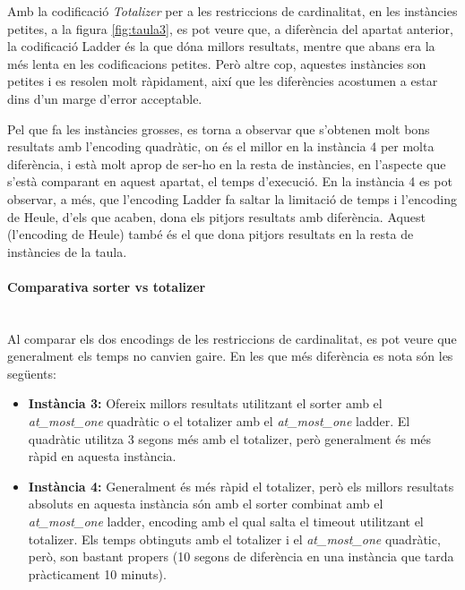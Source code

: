 \documentclass[11pt,a4paper,twoside]{report}
\begin{document}
  Amb la codificació \textit{Totalizer} per a les restriccions de cardinalitat, en les instàncies petites, a la figura \ref{fig:taula3}, 
  es pot veure que, a diferència del apartat anterior, la codificació Ladder és la que dóna millors resultats, mentre que abans era la més lenta en les codificacions petites. Però altre cop, aquestes instàncies son petites i es resolen molt ràpidament, 
  així que les diferències acostumen a estar dins d'un marge d'error acceptable. 

  Pel que fa les instàncies grosses, es torna a observar que s'obtenen molt bons resultats amb l'encoding quadràtic, on és el millor en la instància 4 per molta diferència, i està molt aprop de ser-ho en la resta de instàncies, 
  en l'aspecte que s'està comparant en aquest apartat, el temps d'execució.
  En la instància 4 es pot observar, a més, que l'encoding Ladder fa saltar la limitació de temps i l'encoding de Heule, d'els que acaben, dona els pitjors resultats amb diferència. 
  Aquest (l'encoding de Heule) també és el que dona pitjors resultats en la resta de instàncies de la taula.




  \paragraph*{Comparativa sorter vs totalizer} ~\\

  Al comparar els dos encodings de les restriccions de cardinalitat, es pot veure que generalment els temps no canvien gaire. En les que més diferència es nota són les següents:
  \begin{itemize}
    \item \textbf{Instància 3: }Ofereix millors resultats utilitzant el sorter amb el \textit{at\_most\_one} quadràtic o el totalizer amb el \textit{at\_most\_one} ladder. El quadràtic utilitza 3 segons més amb el totalizer, però generalment és més ràpid en aquesta instància.
    \item \textbf{Instància 4: }Generalment és més ràpid el totalizer, però els millors resultats absoluts en aquesta instància són amb el sorter combinat amb el \textit{at\_most\_one} ladder, 
    encoding amb el qual salta el timeout utilitzant el totalizer. Els temps obtinguts amb el totalizer i el  \textit{at\_most\_one} quadràtic, però, son bastant propers (10 segons de diferència en una instància que tarda pràcticament 10 minuts). 
  \end{itemize}
\end{document}
